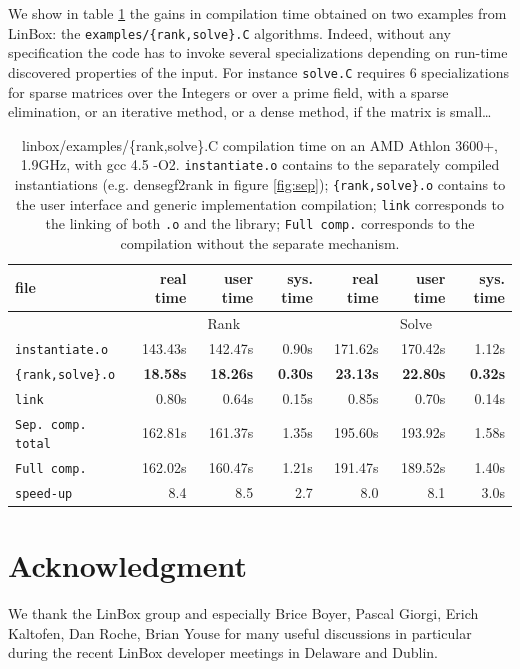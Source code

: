 \documentclass[runningheads,a4paper]{llncs}
\newcommand{\linbox}{{\sc LinBox}\xspace}
\begin{document}
We show in table \ref{tab:compilation} the gains in compilation time
obtained on two examples from \linbox: the \texttt{examples/\{rank,solve\}.C} algorithms. 
 Indeed, without any specification
 the code has to invoke several specializations depending on
 run-time discovered properties of the input. For instance
 \texttt{solve.C} requires 6 specializations for sparse
 matrices over the Integers or over a prime field, with a sparse
 elimination, or an iterative method, or a dense method, if the matrix
 is small\ldots
\vspace{-10pt}\begin{table}[ht]\center
\begin{tabular}{|l||r|r|r||r|r|r|}
\hline
file                      &  real time   &  user time   &  sys. time  &  real time   &  user time   &  sys. time \\
\hline
 & \multicolumn{3}{|c||}{Rank}& \multicolumn{3}{|c|}{Solve}\\
\hline
\texttt{instantiate.o} & 143.43s & 142.47s & 0.90s & 171.62s & 170.42s & 1.12s\\
\texttt{\{rank,solve\}.o} & \bf 18.58s & \bf 18.26s & \bf 0.30s & \bf 23.13s & \bf 22.80s & \bf 0.32s\\
\texttt{link} & 0.80s & 0.64s & 0.15s & 0.85s & 0.70s & 0.14s\\
\hline
\texttt{Sep. comp. total} & 162.81s & 161.37s & 1.35s & 195.60s & 193.92s & 1.58s\\
\hline
\texttt{Full comp.} & 162.02s & 160.47s & 1.21s & 191.47s & 189.52s & 1.40s\\
\hline
\hline
\texttt{speed-up} & 8.4 & 8.5 & 2.7 & 8.0 & 8.1 & 3.0s\\
\hline
\end{tabular} 
\caption{linbox/examples/\{rank,solve\}.C compilation time on an AMD
  Athlon 3600+, 1.9GHz, with gcc 4.5 -O2. \texttt{instantiate.o} contains to the separately compiled
  instantiations (e.g. densegf2rank in figure \ref{fig:sep});
  \texttt{\{rank,solve\}.o} contains to the user interface and generic
  implementation compilation; \texttt{link} corresponds to the linking
  of both \texttt{.o} and the library; \texttt{Full comp.} corresponds
  to the compilation without the separate
  mechanism.}\label{tab:compilation}
\end{table}\vspace{-30pt}
%

\section*{Acknowledgment}
We thank the \linbox group and especially Brice Boyer, Pascal Giorgi,
Erich Kaltofen, Dan Roche, Brian Youse for many useful discussions 
in particular during the recent \linbox developer meetings in
Delaware and Dublin.
%

 
%
\end{document}
